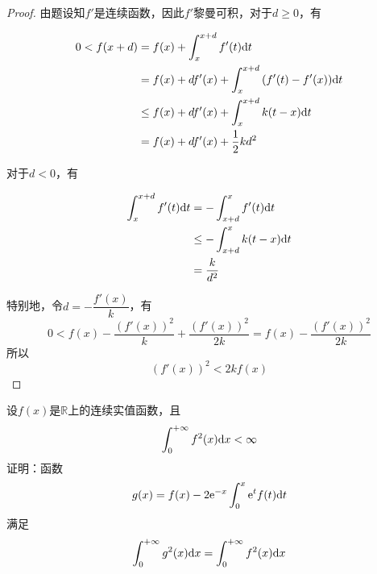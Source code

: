 \begin{proof}

    由题设知$f'$是连续函数，因此$f'$黎曼可积，对于$d \geq 0$，有

    \begin{align*}
        0 < f(x + d) & = f(x) + \int_{x}^{x + d}{f'(t)}\mathrm{d} t \\
        & = f(x) + df'(x) + \int_{x}^{x + d}{(f'(t) - f'(x))}\mathrm{d} t \\
        & \leq f(x) + df'(x) + \int_{x}^{x + d}{k(t - x)}\mathrm{d} t \\
        & = f(x) + df'(x) + \dfrac{1}{2}kd^2
    \end{align*}

    对于$d < 0$，有

    \begin{align*}
        \int_{x}^{x + d}{f'(t)}\mathrm{d} t & = - \int_{x + d}^{x}{f'(t)}\mathrm{d} t \\
        & \leq -  \int_{x + d}^{x}{k(t - x)}\mathrm{d} t \\
        & = \dfrac{k}{d^2}
    \end{align*}

    特别地，令$d = -\dfrac{f'(x)}{k}$，有
    \[0 < f(x) - \dfrac{\left( f'(x) \right)^2}{k} + \dfrac{\left( f'(x) \right)^2}{2k} = f(x) - \dfrac{\left( f'(x) \right)^2}{2k}\]
    所以
    \[\left( f'(x) \right)^2 < 2kf(x)\]
    
\end{proof}

\begin{proposition}

    设$f(x)$是$\mathbb{R}$上的连续实值函数，且
    \[\int_{0}^{+\infty}{f^2(x)}\mathrm{d} x < \infty\]
    证明：函数
    \[g(x) = f(x) - 2\mathrm{e}^{-x}\int_{0}^{x}{\mathrm{e}^tf(t)}\mathrm{d} t\]
    满足
    \[\int_{0}^{+\infty}{g^2(x)}\mathrm{d} x = \int_{0}^{+\infty}{f^2(x)}\mathrm{d} x\]

\end{proposition}

